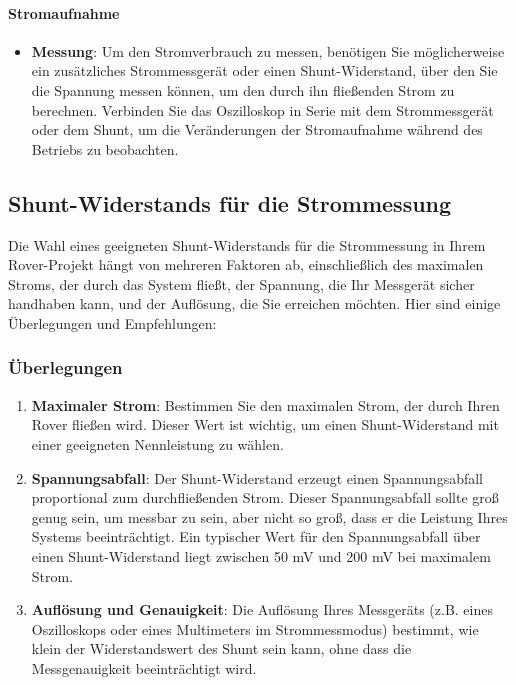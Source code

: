 \documentclass{vorlage-design-main}
\begin{document}
\hypertarget{stromaufnahme}{%
\paragraph{Stromaufnahme}\label{stromaufnahme}}

\begin{itemize}

\item
  \textbf{Messung}: Um den Stromverbrauch zu messen, benötigen Sie
  möglicherweise ein zusätzliches Strommessgerät oder einen
  Shunt-Widerstand, über den Sie die Spannung messen können, um den
  durch ihn fließenden Strom zu berechnen. Verbinden Sie das Oszilloskop
  in Serie mit dem Strommessgerät oder dem Shunt, um die Veränderungen
  der Stromaufnahme während des Betriebs zu beobachten.
\end{itemize}

\hypertarget{shunt-widerstands-fuxfcr-die-strommessung}{%
\subsection{Shunt-Widerstands für die
Strommessung}\label{shunt-widerstands-fuer-die-strommessung}}

Die Wahl eines geeigneten Shunt-Widerstands für die Strommessung in
Ihrem Rover-Projekt hängt von mehreren Faktoren ab, einschließlich des
maximalen Stroms, der durch das System fließt, der Spannung, die Ihr
Messgerät sicher handhaben kann, und der Auflösung, die Sie erreichen
möchten. Hier sind einige Überlegungen und Empfehlungen:

\hypertarget{uxfcberlegungen}{%
\subsubsection{Überlegungen}\label{ueberlegungen}}

\begin{enumerate}
\def\labelenumi{\arabic{enumi}.}
\item
  \textbf{Maximaler Strom}: Bestimmen Sie den maximalen Strom, der durch
  Ihren Rover fließen wird. Dieser Wert ist wichtig, um einen
  Shunt-Widerstand mit einer geeigneten Nennleistung zu wählen.
\item
  \textbf{Spannungsabfall}: Der Shunt-Widerstand erzeugt einen
  Spannungsabfall proportional zum durchfließenden Strom. Dieser
  Spannungsabfall sollte groß genug sein, um messbar zu sein, aber nicht
  so groß, dass er die Leistung Ihres Systems beeinträchtigt. Ein
  typischer Wert für den Spannungsabfall über einen Shunt-Widerstand
  liegt zwischen 50 mV und 200 mV bei maximalem Strom.
\item
  \textbf{Auflösung und Genauigkeit}: Die Auflösung Ihres Messgeräts
  (z.B. eines Oszilloskops oder eines Multimeters im Strommessmodus)
  bestimmt, wie klein der Widerstandswert des Shunt sein kann, ohne dass
  die Messgenauigkeit beeinträchtigt wird.
\end{enumerate}
\end{document}
